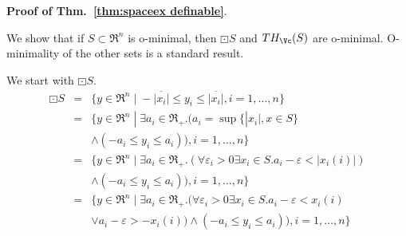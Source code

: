 {\large \textbf{Proof of Thm.~\ref{thm:spaceex definable}}.}
\begin{prf}
	\newcommand{\EPS}{\mathcal{E}}
	We show that if $S \subset \Re^n$ is o-minimal, then $\boxdot S$ and $TH_\Vc(S)$ are o-minimal. 
	O-minimality of the other sets is a standard result.
	
	We start with $\boxdot S$.
	\begin{eqnarray*}
		\boxdot S &=& \{y \in \Re^n \;|\; -\overline{|x_i|}\leq y_i \leq \overline{|x_i|},i=1,\ldots,n\}
		\\
		&=& \{y \in \Re^n \;|\; \exists a_i \in \Re_+. (a_i = \sup \{|x_i|,x\in S\} 
		\\
		&& \land (-a_i\leq y_i \leq a_i)),i=1,\ldots,n\}
		\\
		&=&  \{y \in \Re^n \;|\; \exists a_i \in \Re_+. (\forall \varepsilon_i>0 \exists x_i \in S . a_i-\varepsilon < |x_i(i)|)
		\\
		&& \land (-a_i\leq y_i \leq a_i)),i=1,\ldots,n\}
		\\
		&=&  \{y \in \Re^n \;|\; \exists a_i \in \Re_+. (\forall \varepsilon_i>0 \exists x_i \in S . a_i-\varepsilon < x_i(i)
		\\
		&& \lor a_i - \varepsilon > -x_i(i)) \land (-a_i\leq y_i \leq a_i)),i=1,\ldots,n\}
\end{eqnarray*}


\end{prf}
